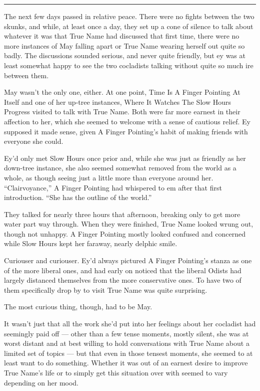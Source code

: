 \begin{center}\rule{0.5\linewidth}{0.5pt}\end{center}

The next few days passed in relative peace. There were no fights between the two skunks, and while, at least once a day, they set up a cone of silence to talk about whatever it was that True Name had discussed that first time, there were no more instances of May falling apart or True Name wearing herself out quite so badly. The discussions sounded serious, and never quite friendly, but ey was at least somewhat happy to see the two cocladists talking without quite so much ire between them.

May wasn't the only one, either. At one point, Time Is A Finger Pointing At Itself and one of her up-tree instances, Where It Watches The Slow Hours Progress visited to talk with True Name. Both were far more earnest in their affection to her, which she seemed to welcome with a sense of cautious relief. Ey supposed it made sense, given A Finger Pointing's habit of making friends with everyone she could.

Ey'd only met Slow Hours once prior and, while she was just as friendly as her down-tree instance, she also seemed somewhat removed from the world as a whole, as though seeing just a little more than everyone around her. ``Clairvoyance,'' A Finger Pointing had whispered to em after that first introduction. ``She has the outline of the world.''

They talked for nearly three hours that afternoon, breaking only to get more water part way through. When they were finished, True Name looked wrung out, though not unhappy. A Finger Pointing mostly looked confused and concerned while Slow Hours kept her faraway, nearly delphic smile.

Curiouser and curiouser. Ey'd always pictured A Finger Pointing's stanza as one of the more liberal ones, and had early on noticed that the liberal Odists had largely distanced themselves from the more conservative ones. To have two of them specifically drop by to visit True Name was quite surprising.

The most curious thing, though, had to be May.

It wasn't just that all the work she'd put into her feelings about her cocladist had seemingly paid off — other than a few tense moments, mostly silent, she was at worst distant and at best willing to hold conversations with True Name about a limited set of topics — but that even in those tensest moments, she seemed to at least want to do something. Whether it was out of an earnest desire to improve True Name's life or to simply get this situation over with seemed to vary depending on her mood.

